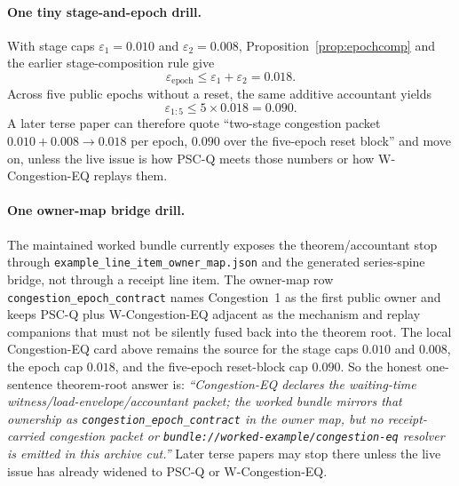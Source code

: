 \documentclass[11pt]{article}
\theoremstyle{definition}
\theoremstyle{remark}
\newcommand{\eps}{\varepsilon}
\begin{document}
\paragraph{One tiny stage-and-epoch drill.}
With stage caps $\eps_1=0.010$ and $\eps_2=0.008$, Proposition~\ref{prop:epochcomp} and the earlier stage-composition rule give
\[
\eps_{\mathrm{epoch}}\le \eps_1+\eps_2 = 0.018.
\]
Across five public epochs without a reset, the same additive accountant yields
\[
\eps_{1:5}\le 5\times 0.018 = 0.090.
\]
A later terse paper can therefore quote ``two-stage congestion packet $0.010+0.008\rightarrow 0.018$ per epoch, $0.090$ over the five-epoch reset block'' and move on, unless the live issue is how PSC-Q meets those numbers or how W-Congestion-EQ replays them.

\paragraph{One owner-map bridge drill.}
The maintained worked bundle currently exposes the theorem/accountant stop through \nolinkurl{example\_line\_item\_owner\_map.json} and the generated series-spine bridge, not through a receipt line item. The owner-map row \nolinkurl{congestion\_epoch\_contract} names Congestion~1 as the first public owner and keeps PSC-Q plus W-Congestion-EQ adjacent as the mechanism and replay companions that must not be silently fused back into the theorem root. The local Congestion-EQ card above remains the source for the stage caps $0.010$ and $0.008$, the epoch cap $0.018$, and the five-epoch reset-block cap $0.090$. So the honest one-sentence theorem-root answer is: \emph{``Congestion-EQ declares the waiting-time witness/load-envelope/accountant packet; the worked bundle mirrors that ownership as \nolinkurl{congestion\_epoch\_contract} in the owner map, but no receipt-carried congestion packet or \nolinkurl{bundle://worked-example/congestion-eq} resolver is emitted in this archive cut.''} Later terse papers may stop there unless the live issue has already widened to PSC-Q or W-Congestion-EQ.\cite{series:workedexample,series:seriesspines,series:pscq,series:wcongeq}
\end{document}
